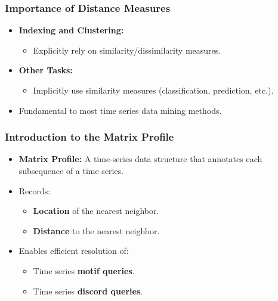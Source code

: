 \begin{frame}[fragile]\frametitle{Importance of Distance Measures}
    \begin{itemize}
        \item \textbf{Indexing and Clustering:}
            \begin{itemize}
                \item Explicitly rely on similarity/dissimilarity measures.
            \end{itemize}
        \item \textbf{Other Tasks:}
            \begin{itemize}
                \item Implicitly use similarity measures (classification, prediction, etc.).
            \end{itemize}
        \item Fundamental to most time series data mining methods.
    \end{itemize}
\end{frame}
\begin{frame}[fragile]\frametitle{Introduction to the Matrix Profile}
    \begin{itemize}
        \item \textbf{Matrix Profile:} A time-series data structure that annotates each subsequence of a time series.
        \item Records:
            \begin{itemize}
                \item \textbf{Location} of the nearest neighbor.
                \item \textbf{Distance} to the nearest neighbor.
            \end{itemize}
        \item Enables efficient resolution of:
            \begin{itemize}
                \item Time series \textbf{motif queries}.
                \item Time series \textbf{discord queries}.
            \end{itemize}
    \end{itemize}
\end{frame}


